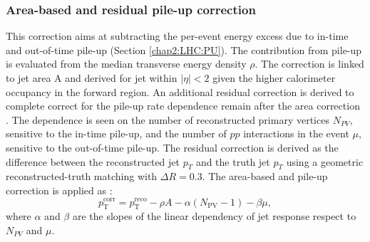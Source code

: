 \subsubsection{Area-based and residual pile-up correction}
\label{Jet:Cal:chain:AreaPU}
This correction aims at subtracting the per-event energy excess due to in-time and out-of-time pile-up (Section \ref{chap2:LHC:PU}). The contribution from pile-up is evaluated from the median transverse energy density $\rho$. The correction is linked to jet area A and derived for jet within $|\eta|<2$ given the higher calorimeter occupancy in the forward region. An additional residual correction is derived to complete correct for the pile-up rate dependence remain after the area correction \cite{PileUp_Sub}. The dependence is seen on the number of reconstructed primary vertices $N_{PV}$, sensitive to the in-time pile-up, and the number of $pp$ interactions in the event $\mu$, sensitive to the out-of-time pile-up. The residual correction is derived as the difference between the reconstructed jet $p_{T}$ and the truth jet $p_{T}$ using a geometric reconstructed-truth matching with $\Delta R=0.3$. The area-based and pile-up correction is applied as :
\begin{equation}
    p_{\mathrm{T}}^{\mathrm{corr}}=p_{\mathrm{T}}^{\mathrm{reco}}-\rho A-\alpha\left(N_{\mathrm{PV}}-1\right)-\beta \mu,
\end{equation}
where $\alpha$ and $\beta$ are the slopes of the linear dependency of jet response respect to $N_{PV}$ and $\mu$.

